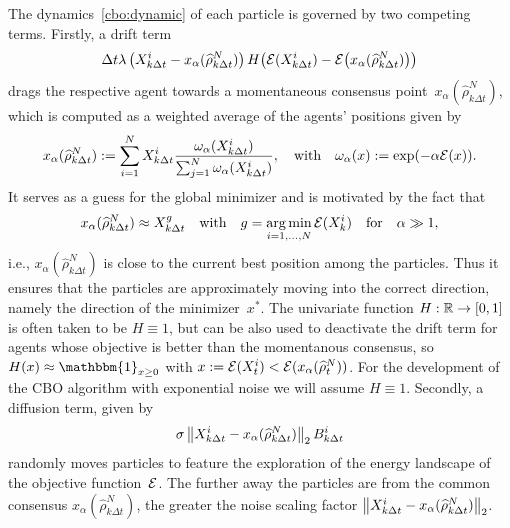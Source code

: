 \documentclass[a4paper, 11pt]{article}
\newcommand{\globmin}{x^*}
\newcommand{\cutoff}[1]{H\!\left({#1}\right)}
\newcommand{\cutoffnoarg}{H}
\newcommand{\omegaa}[0]{\omega_{\alpha}}
\newcommand{\conspoint}[1]{x_{\alpha}({#1})}
\newcommand{\textconspoint}[1]{x_{\alpha}({#1})}
\newcommand{\empmeasure}[1]{\widehat\rho_{#1}^N}
\begin{document}
The dynamics~\eqref{cbo:dynamic} of each particle is governed by two competing terms. Firstly, a drift term
\begin{equation} \label{cbo:drift}
    \Delta t\lambda\left( X_{k\Delta t}^i - \conspoint{\empmeasure{k\Delta t}}\right)\cutoff{\CE( X_{k\Delta t}^i)-\CE\!\left(\conspoint{\empmeasure{k\Delta t}}\right)}
\end{equation} drags the respective agent towards a momentaneous consensus point~$\conspoint{\empmeasure{k\Delta t}}$, which is computed as a weighted average of the agents' positions given by
\begin{align} \label{eq:momentaneous_consensus}
    \conspoint{\empmeasure{k\Delta t}} := \sum_{i=1}^N X^i_{k\Delta t} \frac{\omegaa(X^i_{k\Delta t})}{\sum_{j=1}^N \omegaa(X_{k\Delta t}^i)},\quad \textrm{with}\quad \omegaa(x) := \exp(-\alpha \CE(x)).
\end{align}
It serves as a guess for the global minimizer and is motivated by the fact that $$\conspoint{\empmeasure{k\Delta t}}\approx X^g_{k\Delta t} \quad \textrm{with} \quad g = \argmin_{i=1,\dots,N} \CE(X^i_{k})\quad \textrm{for} \quad  \alpha\gg1, $$ i.e., $\conspoint{\empmeasure{k\Delta t}}$ is close to the current best position among the particles.
Thus it ensures that the particles are approximately moving into the correct direction, namely the direction of the minimizer~$\globmin$.
The univariate function \mbox{$\cutoffnoarg : \bbR\rightarrow [0,1]$} is often taken to be $\cutoffnoarg \equiv 1$, but can be also used to deactivate the drift term for agents whose objective is better than the momentanous consensus, so $\cutoff{x} \approx \mathbbm{1}_{x \geq 0}$ with $x := \CE(X_t^i) < \CE(\textconspoint{\empmeasure{t}})$. For the development of the CBO algorithm with exponential noise we will assume $\cutoffnoarg \equiv 1$.
Secondly, a diffusion term, given by
\begin{equation} \label{cbo:diffusion}
    \sigma \N{ X_{k\Delta t}^i-\conspoint{\empmeasure{k\Delta t}}}_2  B_{k\Delta t}^i
\end{equation}
randomly moves particles to feature the exploration of the energy landscape of the objective function~${\cal E}$. The further away the particles are from the common consensus $\conspoint{\empmeasure{k\Delta t}}$, the greater the noise scaling factor $\N{ X_{k\Delta t}^i-\conspoint{\empmeasure{k\Delta t}}}_2$.
\end{document}
